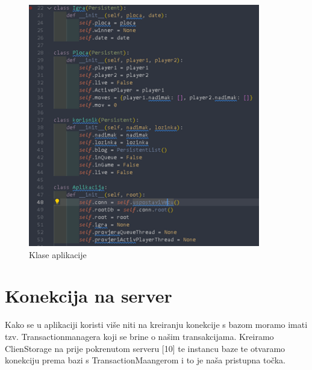 \documentclass[]{foi} %
\begin{document}
\begin{figure}[]
    \centering
    \includegraphics[width=0.9\textwidth]{slike/impl_1.png}
    \caption{Klase aplikacije \cite{Vlastita izrada}}
    \label{fig:podjela}
\end{figure}


\section{Konekcija na server}

Kako se u aplikaciji koristi više niti na kreiranju konekcije s bazom moramo imati tzv. Transactionmanagera koji se brine o našim transakcijama. Kreiramo ClienStorage na prije pokrenutom serveru  [10] te instancu baze te otvaramo konekciju prema bazi s TransactionMaangerom i to je naša pristupna točka.
\end{document}
